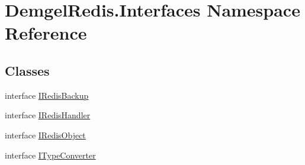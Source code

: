 \hypertarget{namespace_demgel_redis_1_1_interfaces}{}\section{Demgel\+Redis.\+Interfaces Namespace Reference}
\label{namespace_demgel_redis_1_1_interfaces}
\subsection*{Classes}
\begin{DoxyCompactItemize}
\item 
interface \hyperlink{interface_demgel_redis_1_1_interfaces_1_1_i_redis_backup}{I\+Redis\+Backup}
\item 
interface \hyperlink{interface_demgel_redis_1_1_interfaces_1_1_i_redis_handler}{I\+Redis\+Handler}
\item 
interface \hyperlink{interface_demgel_redis_1_1_interfaces_1_1_i_redis_object}{I\+Redis\+Object}
\item 
interface \hyperlink{interface_demgel_redis_1_1_interfaces_1_1_i_type_converter}{I\+Type\+Converter}
\end{DoxyCompactItemize}

